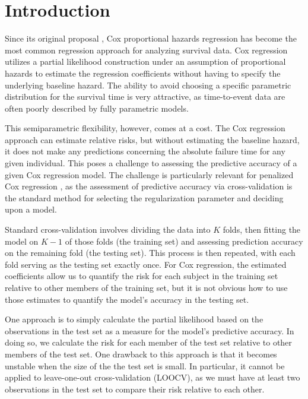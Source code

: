 \section{Introduction}
\par Since its original proposal \citep{Cox1972}, Cox proportional hazards regression has become the most common regression approach for analyzing survival data.  Cox regression utilizes a partial likelihood construction under an assumption of proportional hazards to estimate the regression coefficients without having to specify the underlying baseline hazard.  The ability to avoid choosing a specific parametric distribution for the survival time is very attractive, as time-to-event data are often poorly described by fully parametric models.


This semiparametric flexibility, however, comes at a cost. The Cox regression approach can estimate relative risks, but without estimating the baseline hazard, it does not make any predictions concerning the absolute failure time for any given individual.  This poses a challenge to assessing the predictive accuracy of a given Cox regression model.  The challenge is particularly relevant for penalized Cox regression \citep{Tibshirani1997,Fan2002}, as the assessment of predictive accuracy via cross-validation is the standard method for selecting the regularization parameter and deciding upon a model.

\par Standard cross-validation involves dividing the data into $K$ folds, then fitting the model on $K-1$ of those folds (the training set) and assessing prediction accuracy on the remaining fold (the testing set). This process is then repeated, with each fold serving as the testing set exactly once. For Cox regression, the estimated coefficients allow us to quantify the risk for each subject in the training set relative to other members of the training set, but it is not obvious how to use those estimates to quantify the model's accuracy in the testing set.

\par One approach is to simply calculate the partial likelihood based on the observations in the test set as a measure for the model's predictive accuracy.  In doing so, we calculate the risk for each member of the test set relative to other members of the test set.  One drawback to this approach is that it becomes unstable when the size of the the test set is small.  In particular, it cannot be applied to leave-one-out cross-validation (LOOCV), as we must have at least two observations in the test set to compare their risk relative to each other.

